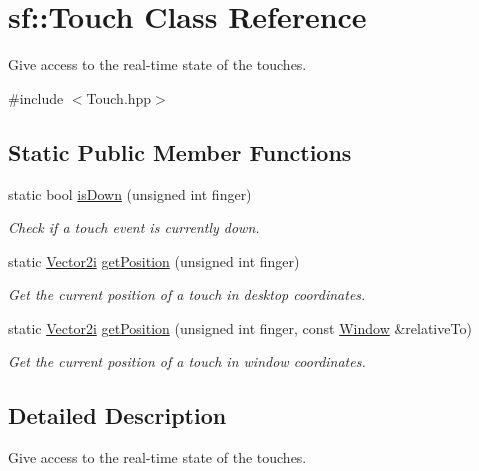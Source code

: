 \hypertarget{classsf_1_1_touch}{}\section{sf\+:\+:Touch Class Reference}
\label{classsf_1_1_touch}


Give access to the real-\/time state of the touches.  




{\ttfamily \#include $<$Touch.\+hpp$>$}

\subsection*{Static Public Member Functions}
\begin{DoxyCompactItemize}
\item 
static bool \mbox{\hyperlink{classsf_1_1_touch_a2f85297123ea4e401d02c346e50d48a3}{is\+Down}} (unsigned int finger)
\begin{DoxyCompactList}\small\item\em Check if a touch event is currently down. \end{DoxyCompactList}\item 
static \mbox{\hyperlink{classsf_1_1_vector2}{Vector2i}} \mbox{\hyperlink{classsf_1_1_touch_af1b7035be709091c7475075e43e2bc23}{get\+Position}} (unsigned int finger)
\begin{DoxyCompactList}\small\item\em Get the current position of a touch in desktop coordinates. \end{DoxyCompactList}\item 
static \mbox{\hyperlink{classsf_1_1_vector2}{Vector2i}} \mbox{\hyperlink{classsf_1_1_touch_a372acaba3c7ac70fca4614c16ac4a1bb}{get\+Position}} (unsigned int finger, const \mbox{\hyperlink{classsf_1_1_window}{Window}} \&relative\+To)
\begin{DoxyCompactList}\small\item\em Get the current position of a touch in window coordinates. \end{DoxyCompactList}\end{DoxyCompactItemize}


\subsection{Detailed Description}
Give access to the real-\/time state of the touches. 

\begin{DoxyVerb}\end{DoxyVerb}



